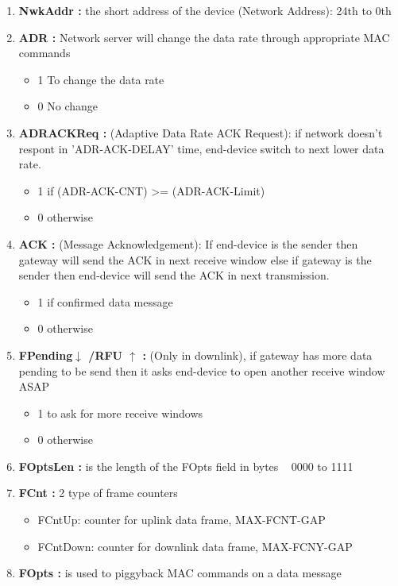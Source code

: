 \begin{landscape}
\begin{multicols}{2}
\begin{enumerate}
	\item \textbf{NwkAddr :} the short address of the device (Network Address): 24th to 0th
	\item \textbf{ADR :}  Network server will change the data rate through appropriate MAC commands
	\begin{itemize}
		\item 1  To change the data rate
		\item 0  No change
	\end{itemize}
	\item \textbf{ADRACKReq :} (Adaptive Data Rate ACK Request): if network doesn't respont in 'ADR-ACK-DELAY' time, end-device switch to next lower data rate.
	\begin{itemize}
		\item 1  if (ADR-ACK-CNT) >= (ADR-ACK-Limit)
		\item 0  otherwise
	\end{itemize}
	\item \textbf{ACK :} (Message Acknowledgement): If end-device is the sender then gateway will send the ACK in next receive window  else if gateway is the sender then end-device will send the ACK in next transmission.
	\begin{itemize}
		\item 1  if confirmed data message
		\item 0  otherwise
	\end{itemize}
	\item \textbf{FPending$\downarrow$ /RFU $\uparrow$ :} (Only in downlink), if gateway has more data pending to be send then it asks end-device to open another receive window ASAP
	\begin{itemize}
		\item 1  to ask for more receive windows
		\item 0  otherwise
	\end{itemize}
	\item \textbf{FOptsLen :} is the length of the FOpts field in bytes   0000 to 1111 
	\item \textbf{FCnt :}  2 type of frame counters 
	\begin{itemize}
		\item FCntUp:  counter for uplink data frame, MAX-FCNT-GAP
		\item FCntDown:  counter for downlink data frame, MAX-FCNY-GAP
	\end{itemize}  
	\item \textbf{FOpts :} is used to piggyback MAC commands on a data message	

\end{enumerate}
\end{multicols}
\end{landscape}
